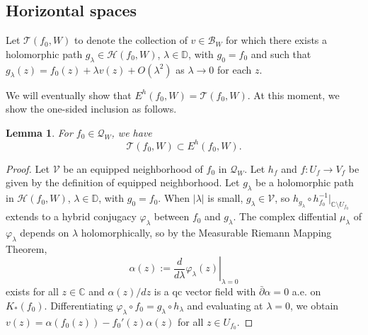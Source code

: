 \documentclass{amsart}
\numberwithin{equation}{section}
\newtheorem{lemma}[theorem]{Lemma}%
\newcommand{\C}{\mathbb C}
\theoremstyle{definition}
\theoremstyle{remark}
\begin{document}
\subsection{Horizontal spaces}


Let $\mathcal{T}(f_0,W)$ to denote the collection of $v\in \mathcal{B}_W$ for which there exists a holomorphic path $g_\lambda\in \mathcal{H}(f_0, W)$, $\lambda\in \mathbb{D}$, with $g_0=f_0$ and such that
$g_\lambda(z)=f_0(z)+\lambda v(z)+ O(\lambda^2)$
as $\lambda\to 0$ for each $z$.

We will eventually show that $E^h(f_0,W)=\mathcal{T}(f_0,W)$. At this moment, we show the one-sided inclusion as follows.  

\begin{lemma}\label{lem:tan=hor} For $f_0\in \mathcal{Q}_{W}$, we have 
$$\mathcal{T}(f_0,W)\subset E^h(f_0,W).$$
\end{lemma} 
\begin{proof}
Let $\mathcal{V}$ be an equipped neighborhood of $f_0$ in $\mathcal{Q}_W$. Let $h_f$ and $f:U_f \to V_f$ be given by the definition of equipped neighborhood. Let $g_\lambda$ be a holomorphic path in $\mathcal{H}(f_0, W)$, $\lambda\in \mathbb{D}$, with $g_0=f_0$. When $|\lambda|$ is small, $g_\lambda\in \mathcal{V}$, so $h_{g_\lambda}\circ h_{f_0}^{-1}|_{\C\setminus U_{f_0}}$ extends to a hybrid conjugacy $\varphi_\lambda$ between $f_0$ and $g_\lambda$. The complex diffential $\mu_\lambda$ of $\varphi_\lambda$ depends on $\lambda$ holomorphically, so  by the Measurable Riemann Mapping Theorem, $$\alpha(z):=\left.\frac{d}{d\lambda} \varphi_\lambda(z)\right|_{\lambda=0}$$
exists for all $z\in \C$ and $\alpha(z)/dz$ is a qc vector field with $\bar{\partial}\alpha=0$ a.e. on $K_*(f_0)$.  Differentiating $\varphi_\lambda\circ f_0=g_\lambda\circ h_\lambda$ and evaluating at $\lambda=0$, we obtain $v(z)=\alpha(f_0(z))-f_0'(z)\alpha(z)$ for all $z\in U_{f_0}$. 
\end{proof}
\end{document}
